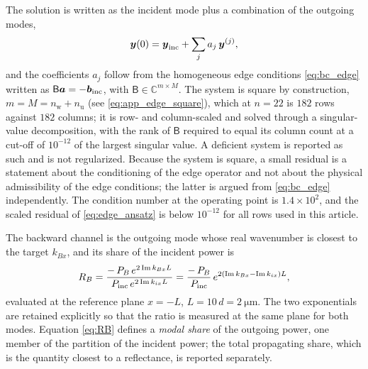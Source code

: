 The solution is written as the incident mode plus a combination of the outgoing
modes,
\begin{equation}
\label{eq:edge_ansatz}
\boldsymbol{y}(0)=\boldsymbol{y}_{\text{inc}}+\sum_{j}a_j\,\boldsymbol{y}^{(j)},
\end{equation}
and the coefficients $a_j$ follow from the homogeneous edge conditions
\eqref{eq:bc_edge} written as
$\mathsf{B}\boldsymbol{a}=-\boldsymbol{b}_{\text{inc}}$, with
$\mathsf{B}\in\mathbb{C}^{m\times M}$.  The system is square by construction,
$m=M=n_{\mathrm{w}}+n_{\mathrm{u}}$ (see \eqref{eq:app_edge_square}), which at
$n=22$ is $182$ rows against $182$ columns; it is row- and column-scaled and
solved through a singular-value decomposition, with the rank of $\mathsf{B}$
required to equal its column count at a cut-off of $10^{-12}$ of the largest
singular value.  A deficient system is reported as such and is not regularized.
Because the system is square, a small residual is a statement about the
conditioning of the edge operator and not about the physical admissibility of the
edge conditions; the latter is argued from \eqref{eq:bc_edge} independently.  The condition number at the
operating point is $1.4\times10^{2}$, and the scaled residual of
\eqref{eq:edge_ansatz} is below $10^{-12}$ for all rows used in this article.

The backward channel is the outgoing mode whose real wavenumber is closest to
the target $k_{Bx}$, and its share of the incident power is
\begin{equation}
\label{eq:RB}
R_B=\frac{-\,P_{B}\,e^{2\operatorname{Im} k_{Bx}L}}{P_{\text{inc}}\,e^{2\operatorname{Im} k_{ix}L}}
=\frac{-\,P_{B}}{P_{\text{inc}}}\,e^{2(\operatorname{Im} k_{Bx}-\operatorname{Im} k_{ix})L},
\end{equation}
evaluated at the reference plane $x=-L$, $L=10\,d=\SI{2}{\micro\metre}$.  The
two exponentials are retained explicitly so that the ratio is measured at the
same plane for both modes.  Equation \eqref{eq:RB} defines a \emph{modal share}
of the outgoing power, one member of the partition of the incident power; the
total propagating share, which is the quantity closest to a reflectance, is
reported separately.


